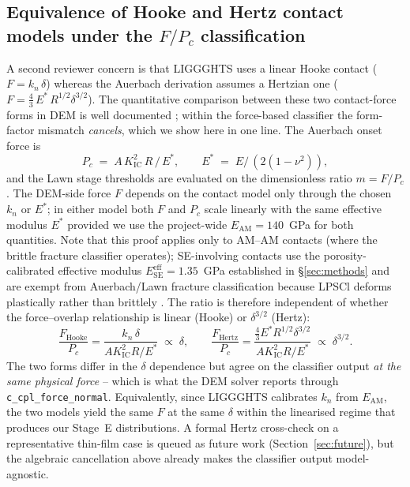 \documentclass[11pt, a4paper]{article}
\begin{document}
\subsection{Equivalence of Hooke and Hertz contact models under
            the $F/P_c$ classification}
\label{sec:hooke-hertz}
A second reviewer concern is that LIGGGHTS uses a linear Hooke
contact ($F = k_n\,\delta$) whereas the Auerbach derivation
\citep{Auerbach1891, Lawn1998} assumes a Hertzian one
\citep{Hertz1882} ($F = \tfrac{4}{3}\,E^{\!*}\,R^{1/2}
\delta^{3/2}$).  The quantitative comparison between these two
contact-force forms in DEM is well documented
\citep{Thornton1997, DiRenzo2004}; within the force-based
classifier the form-factor mismatch \emph{cancels}, which we show
here in one line.  The
Auerbach onset force is
\begin{equation}
  P_c \;=\; A\,K_{\mathrm{IC}}^{2}\,R\, / \,E^{\!*},
  \qquad
  E^{\!*} \;=\; E / \,(2(1-\nu^{2})),
  \label{eq:Pc}
\end{equation}
and the Lawn stage thresholds are evaluated on the dimensionless
ratio $m = F/P_c$. The DEM-side force $F$ depends on the contact
model only through the chosen $k_n$ or $E^{\!*}$; in either model
both $F$ and $P_c$ scale linearly with the same effective modulus
$E^{\!*}$ provided we use the project-wide $E_{\mathrm{AM}} =
140$~GPa for both quantities.  Note that this proof applies only
to AM--AM contacts (where the brittle fracture classifier
operates); SE-involving contacts use the porosity-calibrated
effective modulus $E_{\mathrm{SE}}^{\mathrm{eff}} = 1.35$~GPa
established in \S\ref{sec:methods} and are exempt from
Auerbach/Lawn fracture classification because LPSCl deforms
plastically rather than brittlely \citep{Sakuda2013}.  The ratio
is therefore independent of whether the force--overlap relationship
is linear (Hooke) or $\delta^{3/2}$ (Hertz):
\begin{equation}
  \frac{F_{\mathrm{Hooke}}}{P_c} =
  \frac{k_n\,\delta}{A K_{\mathrm{IC}}^2 R / E^{\!*}}
  \;\propto\; \delta,
  \qquad
  \frac{F_{\mathrm{Hertz}}}{P_c} =
  \frac{\tfrac{4}{3} E^{\!*} R^{1/2} \delta^{3/2}}
       {A K_{\mathrm{IC}}^2 R / E^{\!*}}
  \;\propto\; \delta^{3/2}.
\end{equation}
The two forms differ in the $\delta$ dependence but agree on the
classifier output \emph{at the same physical force} -- which is
what the DEM solver reports through \texttt{c\_cpl\_force\_normal}.
Equivalently, since LIGGGHTS calibrates $k_n$ from
$E_{\mathrm{AM}}$, the two models yield the same $F$ at the same
$\delta$ within the linearised regime that produces our Stage~E
distributions. A formal Hertz cross-check on a representative
thin-film case is queued as future work
(Section~\ref{sec:future}), but the algebraic cancellation above
already makes the classifier output model-agnostic.
\end{document}
